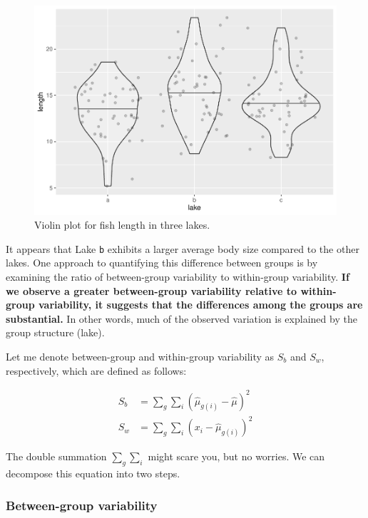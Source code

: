 \documentclass[
]{article}
\begin{document}
\begin{figure}

{\centering \includegraphics{biostats_files/figure-latex/violin-1} 

}

\caption{Violin plot for fish length in three lakes.}\label{fig:violin}
\end{figure}

It appears that Lake \texttt{b} exhibits a larger average body size compared to the other lakes. One approach to quantifying this difference between groups is by examining the ratio of between-group variability to within-group variability. \textbf{If we observe a greater between-group variability relative to within-group variability, it suggests that the differences among the groups are substantial.} In other words, much of the observed variation is explained by the group structure (lake).

Let me denote between-group and within-group variability as \(S_b\) and \(S_w\), respectively, which are defined as follows:

\[
\begin{aligned}
S_b &= \sum_g \sum_i (\hat{\mu}_{g(i)} - \hat{\mu})^2\\
S_w &= \sum_g \sum_i (x_{i} - \hat{\mu}_{g(i)})^2
\end{aligned}
\]

The double summation \(\sum_g \sum_i\) might scare you, but no worries. We can decompose this equation into two steps.

\hypertarget{between-group-variability}{%
\subsubsection{Between-group variability}\label{between-group-variability}}
\end{document}
